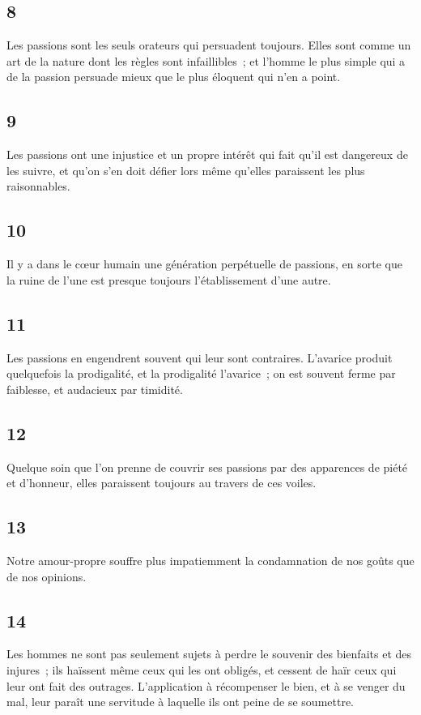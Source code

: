 \documentclass[french,twoside]{book} %
\begin{document}
\subsection[{8}]{ \textsc{8} }
\noindent Les passions sont les seuls orateurs qui persuadent toujours. Elles sont comme un art de la nature dont les règles sont infaillibles ; et l’homme le plus simple qui a de la passion persuade mieux que le plus éloquent qui n’en a point.
\subsection[{9}]{ \textsc{9} }
\noindent Les passions ont une injustice et un propre intérêt qui fait qu’il est dangereux de les suivre, et qu’on s’en doit défier lors même qu’elles paraissent les plus raisonnables.
\subsection[{10}]{ \textsc{10} }
\noindent Il y a dans le cœur humain une génération perpétuelle de passions, en sorte que la ruine de l’une est presque toujours l’établissement d’une autre.
\subsection[{11}]{ \textsc{11} }
\noindent Les passions en engendrent souvent qui leur sont contraires. L’avarice produit quelquefois la prodigalité, et la prodigalité l’avarice ; on est souvent ferme par faiblesse, et audacieux par timidité.
\subsection[{12}]{ \textsc{12} }
\noindent Quelque soin que l’on prenne de couvrir ses passions par des apparences de piété et d’honneur, elles paraissent toujours au travers de ces voiles.
\subsection[{13}]{ \textsc{13} }
\noindent Notre amour-propre souffre plus impatiemment la condamnation de nos goûts que de nos opinions.
\subsection[{14}]{ \textsc{14} }
\noindent Les hommes ne sont pas seulement sujets à perdre le souvenir des bienfaits et des injures ; ils haïssent même ceux qui les ont obligés, et cessent de haïr ceux qui leur ont fait des outrages. L’application à récompenser le bien, et à se venger du mal, leur paraît une servitude à laquelle ils ont peine de se soumettre.
\end{document}
